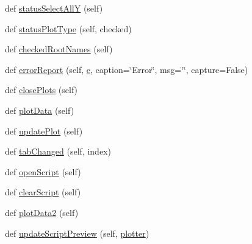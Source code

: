 \begin{DoxyCompactItemize}
\item 
def \mbox{\hyperlink{classgetdist_1_1gui_1_1mainwindow_1_1MainWindow_ac190624a78b6fa51938e90ae5905339b}{status\+Select\+AllY}} (self)
\item 
def \mbox{\hyperlink{classgetdist_1_1gui_1_1mainwindow_1_1MainWindow_ae85c5af302ad331e8bef46559bd585fe}{status\+Plot\+Type}} (self, checked)
\item 
def \mbox{\hyperlink{classgetdist_1_1gui_1_1mainwindow_1_1MainWindow_abdbfb43927d31864cd840b416d281df1}{checked\+Root\+Names}} (self)
\item 
def \mbox{\hyperlink{classgetdist_1_1gui_1_1mainwindow_1_1MainWindow_aa4d50e481a279bfc236264d54e794696}{error\+Report}} (self, \mbox{\hyperlink{plotcls_8m_a08a4415e9d594ff960030b921d42b91e}{e}}, caption=\char`\"{}Error\char`\"{}, msg=\char`\"{}\char`\"{}, capture=False)
\item 
def \mbox{\hyperlink{classgetdist_1_1gui_1_1mainwindow_1_1MainWindow_a149bcf1e24828e673910fe008a7e458d}{close\+Plots}} (self)
\item 
def \mbox{\hyperlink{classgetdist_1_1gui_1_1mainwindow_1_1MainWindow_ae498c95f48e909b62f663f16d824e941}{plot\+Data}} (self)
\item 
def \mbox{\hyperlink{classgetdist_1_1gui_1_1mainwindow_1_1MainWindow_ae40013ba1fe1b4e96660b96f63fe1c8a}{update\+Plot}} (self)
\item 
def \mbox{\hyperlink{classgetdist_1_1gui_1_1mainwindow_1_1MainWindow_a32c6fbc517559d78aa3af57f43ab6eb7}{tab\+Changed}} (self, index)
\item 
def \mbox{\hyperlink{classgetdist_1_1gui_1_1mainwindow_1_1MainWindow_aa1199c47ac9d83249d622855f0d8dcb3}{open\+Script}} (self)
\item 
def \mbox{\hyperlink{classgetdist_1_1gui_1_1mainwindow_1_1MainWindow_a42a1bf08b1097561275a5910945b0b7f}{clear\+Script}} (self)
\item 
def \mbox{\hyperlink{classgetdist_1_1gui_1_1mainwindow_1_1MainWindow_acf1bc04cb32ad1a78b92673311609c7c}{plot\+Data2}} (self)
\item 
def \mbox{\hyperlink{classgetdist_1_1gui_1_1mainwindow_1_1MainWindow_a477f7c9959bc8d12d59af3d102767847}{update\+Script\+Preview}} (self, \mbox{\hyperlink{classgetdist_1_1gui_1_1mainwindow_1_1MainWindow_a620647b2d7bc4f315dd567c2e02fbbb2}{plotter}})
\end{DoxyCompactItemize}
